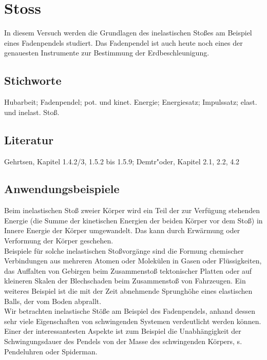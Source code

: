 \chapter{Stoss}
\label{v:1}

In diesem Versuch werden die Grundlagen des inelastischen Sto{\ss}es am Beispiel eines Fadenpendels studiert. Das Fadenpendel ist auch heute noch eines der genauesten Instrumente zur Bestimmung der Erdbeschleunigung.


\section{Stichworte}
Hubarbeit; Fadenpendel; pot. und kinet. Energie; Energiesatz; Impulssatz; elast. und inelast. Sto{\ss}.
%
\section{Literatur}
Gehrtsen, Kapitel 1.4.2/3, 1.5.2 bis 1.5.9; Demtr"oder, Kapitel 2.1, 2.2, 4.2
%
\section{Anwendungsbeispiele}
%
Beim inelastischen Stoß zweier Körper wird ein Teil der zur Verfügung stehenden Energie (die Summe der kinetischen Energien der beiden Körper vor dem Stoß) in Innere Energie der Körper umgewandelt. Das kann durch Erwärmung oder Verformung der Körper geschehen.\\
Beispiele für solche inelastischen Stoßvorgänge sind die Formung chemischer Verbindungen aus mehreren Atomen oder Molekülen in Gasen oder Flüssigkeiten, das Auffalten von Gebirgen beim Zusammenstoß tektonischer Platten oder auf kleineren Skalen der Blechschaden beim Zusammenstoß von Fahrzeugen. Ein weiteres Beispiel ist die mit der Zeit abnehmende Sprunghöhe eines elastischen Balls, der vom Boden abprallt.\\
Wir betrachten inelastische Stöße am Beispiel des Fadenpendels, anhand dessen sehr viele Eigenschaften von schwingenden Systemen verdeutlicht werden können. Einer der interessantesten Aspekte ist zum Beispiel die Unabhängigkeit der Schwingungsdauer des Pendels von der Masse des schwingenden Körpers, s. Pendeluhren oder Spiderman.\\

